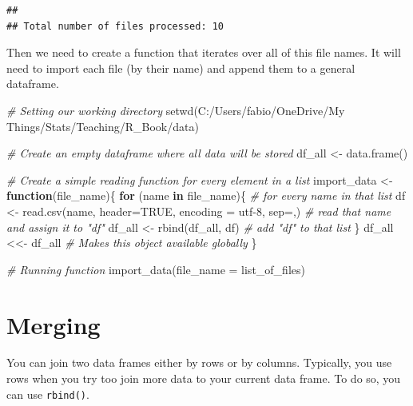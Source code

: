 \documentclass[
]{book}
\newenvironment{Shaded}{\begin{snugshade}}{\end{snugshade}}
\newcommand{\AttributeTok}[1]{\textcolor[rgb]{0.77,0.63,0.00}{#1}}
\newcommand{\CommentTok}[1]{\textcolor[rgb]{0.56,0.35,0.01}{\textit{#1}}}
\newcommand{\ConstantTok}[1]{\textcolor[rgb]{0.00,0.00,0.00}{#1}}
\newcommand{\ControlFlowTok}[1]{\textcolor[rgb]{0.13,0.29,0.53}{\textbf{#1}}}
\newcommand{\FunctionTok}[1]{\textcolor[rgb]{0.00,0.00,0.00}{#1}}
\newcommand{\NormalTok}[1]{#1}
\newcommand{\OtherTok}[1]{\textcolor[rgb]{0.56,0.35,0.01}{#1}}
\newcommand{\StringTok}[1]{\textcolor[rgb]{0.31,0.60,0.02}{#1}}
\begin{document}
\begin{verbatim}
## 
## Total number of files processed: 10
\end{verbatim}

Then we need to create a function that iterates over all of this file names.
It will need to import each file (by their name) and append them to a general dataframe.

\begin{Shaded}
\begin{Highlighting}[]
\CommentTok{\# Setting our working directory}
\FunctionTok{setwd}\NormalTok{(}\StringTok{\textquotesingle{}C:/Users/fabio/OneDrive/My Things/Stats/Teaching/R\_Book/data\textquotesingle{}}\NormalTok{)}

\CommentTok{\# Create an empty dataframe where all data will be stored}
\NormalTok{df\_all }\OtherTok{\textless{}{-}} \FunctionTok{data.frame}\NormalTok{()}

\CommentTok{\# Create a simple reading function for every element in a list}
\NormalTok{import\_data }\OtherTok{\textless{}{-}} \ControlFlowTok{function}\NormalTok{(file\_name)\{}
  \ControlFlowTok{for}\NormalTok{ (name }\ControlFlowTok{in}\NormalTok{ file\_name)\{  }\CommentTok{\# for every name in that list}
\NormalTok{    df }\OtherTok{\textless{}{-}} \FunctionTok{read.csv}\NormalTok{(name, }\AttributeTok{header=}\ConstantTok{TRUE}\NormalTok{, }\AttributeTok{encoding =} \StringTok{\textquotesingle{}utf{-}8\textquotesingle{}}\NormalTok{, }\AttributeTok{sep=}\StringTok{\textquotesingle{},\textquotesingle{}}\NormalTok{)  }\CommentTok{\# read that name and assign it to "df"}
\NormalTok{    df\_all }\OtherTok{\textless{}{-}} \FunctionTok{rbind}\NormalTok{(df\_all, df)  }\CommentTok{\# add "df" to that list   }
\NormalTok{  \}}
\NormalTok{  df\_all }\OtherTok{\textless{}\textless{}{-}}\NormalTok{ df\_all  }\CommentTok{\# Makes this object available globally}
\NormalTok{\}}

\CommentTok{\# Running function}
\FunctionTok{import\_data}\NormalTok{(}\AttributeTok{file\_name =}\NormalTok{ list\_of\_files)}
\end{Highlighting}
\end{Shaded}

\hypertarget{merging}{%
\section{Merging}\label{merging}}

You can join two data frames either by rows or by columns.
Typically, you use rows when you try too join more data to your current data frame.
To do so, you can use \texttt{rbind()}.
\end{document}
